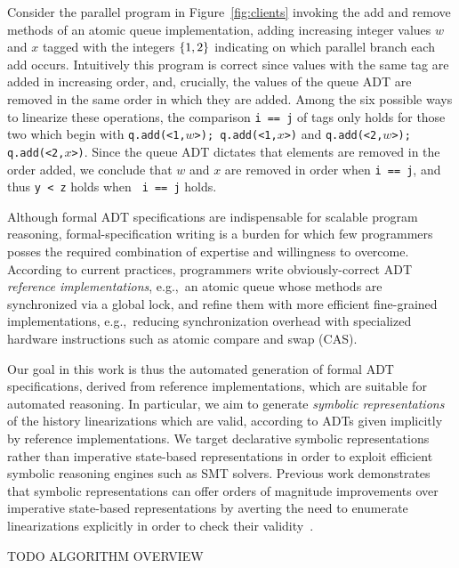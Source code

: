 Consider the parallel program in Figure~\ref{fig:clients} invoking the add and
remove methods of an atomic queue implementation, adding increasing integer
values $w$ and $x$ tagged with the integers ${\{{1,2}\}}$ indicating on which
parallel branch each add occurs. Intuitively this program is correct since
values with the same tag are added in increasing order, and, crucially, the
values of the queue ADT are removed in the same order in which they are added.
Among the six possible ways to linearize these operations, the comparison {\tt i ==
j} of tags only holds for those two which begin with {\tt q.add(<1,$w$>);
q.add(<1,$x$>)} and {\tt q.add(<2,$w$>); q.add(<2,$x$>)}. Since the queue ADT
dictates that elements are removed in the order added, we conclude that $w$ and
$x$ are removed in order when {\tt i == j}, and thus {\tt y < z} holds when {\tt
i == j} holds.

Although formal ADT specifications are indispensable for scalable program
reasoning, formal-specification writing is a burden for which few programmers
posses the required combination of expertise and willingness to overcome.
According to current practices, programmers write obviously-correct ADT
\emph{reference implementations}, e.g.,~an atomic queue whose methods are
synchronized via a global lock, and refine them with more efficient fine-grained
implementations, e.g.,~reducing synchronization overhead with specialized
hardware instructions such as atomic compare and swap (CAS).

Our goal in this work is thus the automated generation of formal ADT
specifications, derived from reference implementations, which are suitable for
automated reasoning. In particular, we aim to generate \emph{symbolic
representations} of the history linearizations which are valid, according to
ADTs given implicitly by reference implementations. We target declarative
symbolic representations rather than imperative state-based representations in
order to exploit efficient symbolic reasoning engines such as SMT solvers.
Previous work demonstrates that symbolic representations can offer orders of
magnitude improvements over imperative state-based representations by averting
the need to enumerate linearizations explicitly in order to check their
validity~\cite{conf/pldi/EmmiEH15}.

TODO ALGORITHM OVERVIEW
